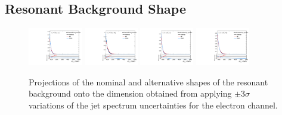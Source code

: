 \subsection{Resonant Background Shape}

\begin{figure}[htbp]
  \centering
  \includegraphics[width=0.21\textwidth]{fig/analysisAppendix/systs_res_e_LP_nobb_LDy_MVVScaleBinW_ProjX.pdf}
  \includegraphics[width=0.21\textwidth]{fig/analysisAppendix/systs_res_e_LP_nobb_HDy_MVVScaleBinW_ProjX.pdf}
  \includegraphics[width=0.21\textwidth]{fig/analysisAppendix/systs_res_e_LP_nobb_LDy_MVVScaleBinTop_ProjX.pdf}
  \includegraphics[width=0.21\textwidth]{fig/analysisAppendix/systs_res_e_LP_nobb_HDy_MVVScaleBinTop_ProjX.pdf}\\
  \caption{
    Projections of the nominal and alternative shapes of the resonant background onto the \MVV dimension obtained from applying $\pm3\sigma$ variations of the jet \pt spectrum uncertainties for the electron channel.
  }
  \label{fig:systResMVV_MVVScale}
\end{figure}


